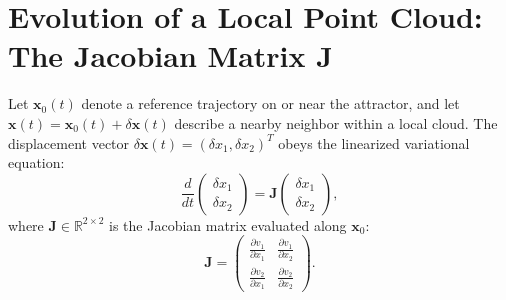 \documentclass[11pt,a4paper]{article}
\begin{document}
\section{Evolution of a Local Point Cloud: The Jacobian Matrix \texorpdfstring{$\mathbf{J}$}{J}}
\label{sec:jacobian_matrix}
Let $\mathbf{x}_0(t)$ denote a reference trajectory on or near the attractor, and let $\mathbf{x}(t) = \mathbf{x}_0(t) + \delta\mathbf{x}(t)$ describe a nearby neighbor within a local cloud. The displacement vector $\delta\mathbf{x}(t) = (\delta x_1, \delta x_2)^T$ obeys the linearized variational equation:
\begin{equation}
    \frac{d}{dt} \begin{pmatrix} \delta x_1 \\ \delta x_2 \end{pmatrix} = \mathbf{J} \begin{pmatrix} \delta x_1 \\ \delta x_2 \end{pmatrix},
    \label{eq:variational_eq}
\end{equation}
where $\mathbf{J} \in \mathbb{R}^{2 \times 2}$ is the Jacobian matrix evaluated along $\mathbf{x}_0$:
\begin{equation}
    \mathbf{J} = \begin{pmatrix} 
    \frac{\partial v_1}{\partial x_1} & \frac{\partial v_1}{\partial x_2} \\[0.5em]
    \frac{\partial v_2}{\partial x_1} & \frac{\partial v_2}{\partial x_2} 
    \end{pmatrix}.
\end{equation}
\end{document}
